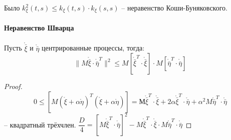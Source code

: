 Было $k_\xi^2 (t, s) \leqslant k_\xi(t, s) \cdot k_\xi(s, s)$ -- неравенство Коши-Буняковского.

\paragraph{Неравенство Шварца}
Пусть $\mathring{\bar{\xi}}$ и $\mathring{\bar{\eta}}$ центрированные процессы, тогда:
\[
  \| M\mathring{\bar{\xi}} \cdot \mathring{\bar{\eta}}^T \|^2 \leqslant M \left[ \mathring{\bar{\xi}}^T \cdot \mathring{\bar{\xi}} \right]\cdot M \left[ \mathring{\bar{\eta}}^T \cdot \mathring{\bar{\eta}} \right] 
\]

\begin{proof}
  \[
    0 \leqslant \left[ M(\mathring{\xi} + \alpha \mathring{\eta})^T (\mathring{\xi} + \alpha \mathring{\eta}) \right]
    = М \mathring{\bar{\xi}}^T \cdot \mathring{\bar{\xi}} + 2 \alpha \mathring{\bar{\xi}}^T \cdot \mathring{\bar{\eta}} + \alpha^2 M \mathring{\bar{\eta}}^T \cdot \mathring{\bar{\eta}}
  \]
  -- квадратный трёхчлен.
  $\dfrac{D}{4} = \left[ M \mathring{\bar{\xi}}^T \cdot \mathring{\bar{\eta}} \right]^2 - M \mathring{\bar{\xi}}^T \cdot \mathring{\bar{\xi}} \cdot M \mathring{\bar{\eta}}^T \cdot \mathring{\bar{\eta}} $
\end{proof}
